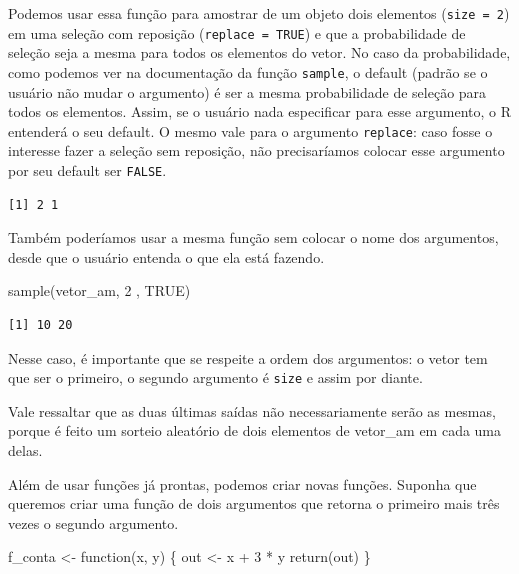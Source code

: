 \documentclass[
  letterpaper,
  DIV=11,
  numbers=noendperiod]{scrreprt}
\newenvironment{Shaded}{\begin{snugshade}}{\end{snugshade}}
\newcommand{\ConstantTok}[1]{\textcolor[rgb]{0.56,0.35,0.01}{#1}}
\newcommand{\ControlFlowTok}[1]{\textcolor[rgb]{0.00,0.23,0.31}{#1}}
\newcommand{\DecValTok}[1]{\textcolor[rgb]{0.68,0.00,0.00}{#1}}
\newcommand{\FunctionTok}[1]{\textcolor[rgb]{0.28,0.35,0.67}{#1}}
\newcommand{\NormalTok}[1]{\textcolor[rgb]{0.00,0.23,0.31}{#1}}
\newcommand{\OtherTok}[1]{\textcolor[rgb]{0.00,0.23,0.31}{#1}}
\newcommand{\SpecialCharTok}[1]{\textcolor[rgb]{0.37,0.37,0.37}{#1}}
\begin{document}
Podemos usar essa função para amostrar de um objeto dois elementos
(\texttt{size\ =\ 2}) em uma seleção com reposição
(\texttt{replace\ =\ TRUE}) e que a probabilidade de seleção seja a
mesma para todos os elementos do vetor. No caso da probabilidade, como
podemos ver na documentação da função \texttt{sample}, o default (padrão
se o usuário não mudar o argumento) é ser a mesma probabilidade de
seleção para todos os elementos. Assim, se o usuário nada especificar
para esse argumento, o R entenderá o seu default. O mesmo vale para o
argumento \texttt{replace}: caso fosse o interesse fazer a seleção sem
reposição, não precisaríamos colocar esse argumento por seu default ser
\texttt{FALSE}.

\begin{verbatim}
[1] 2 1
\end{verbatim}

Também poderíamos usar a mesma função sem colocar o nome dos argumentos,
desde que o usuário entenda o que ela está fazendo.

\begin{Shaded}
\begin{Highlighting}[]
\FunctionTok{sample}\NormalTok{(vetor\_am, }\DecValTok{2}\NormalTok{ , }\ConstantTok{TRUE}\NormalTok{) }
\end{Highlighting}
\end{Shaded}

\begin{verbatim}
[1] 10 20
\end{verbatim}

Nesse caso, é importante que se respeite a ordem dos argumentos: o vetor
tem que ser o primeiro, o segundo argumento é \texttt{size} e assim por
diante.

Vale ressaltar que as duas últimas saídas não necessariamente serão as
mesmas, porque é feito um sorteio aleatório de dois elementos de
vetor\_am em cada uma delas.

Além de usar funções já prontas, podemos criar novas funções. Suponha
que queremos criar uma função de dois argumentos que retorna o primeiro
mais três vezes o segundo argumento.

\begin{Shaded}
\begin{Highlighting}[]
\NormalTok{f\_conta }\OtherTok{\textless{}{-}} \ControlFlowTok{function}\NormalTok{(x, y) \{}
\NormalTok{  out }\OtherTok{\textless{}{-}}\NormalTok{ x }\SpecialCharTok{+} \DecValTok{3} \SpecialCharTok{*}\NormalTok{ y}
  \FunctionTok{return}\NormalTok{(out)}
\NormalTok{\}}
\end{Highlighting}
\end{Shaded}
\end{document}
